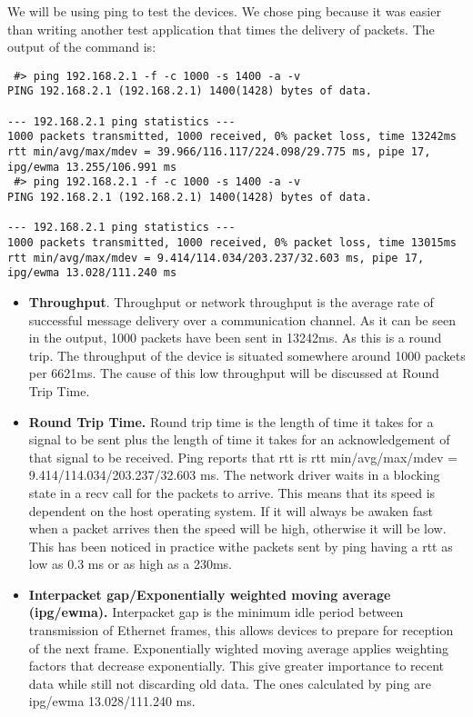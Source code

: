 We will be using ping to test the devices. We chose ping because it was easier than writing another test application
that times the delivery of packets. The output of the command is:
\lstset{language=zsh,caption=,label=lst:pingout}
\begin{lstlisting}
 #> ping 192.168.2.1 -f -c 1000 -s 1400 -a -v
PING 192.168.2.1 (192.168.2.1) 1400(1428) bytes of data.
                 
--- 192.168.2.1 ping statistics ---
1000 packets transmitted, 1000 received, 0% packet loss, time 13242ms
rtt min/avg/max/mdev = 39.966/116.117/224.098/29.775 ms, pipe 17, ipg/ewma 13.255/106.991 ms
 #> ping 192.168.2.1 -f -c 1000 -s 1400 -a -v
PING 192.168.2.1 (192.168.2.1) 1400(1428) bytes of data.
                 
--- 192.168.2.1 ping statistics ---
1000 packets transmitted, 1000 received, 0% packet loss, time 13015ms
rtt min/avg/max/mdev = 9.414/114.034/203.237/32.603 ms, pipe 17, ipg/ewma 13.028/111.240 ms
\end{lstlisting}

\begin{itemize}
  \item \textbf{Throughput}. Throughput or network throughput is the average rate of successful message delivery 
over a communication channel. As it can be seen in the output, 1000 packets have been sent in 13242ms. As this
is a round trip. The throughput of the device is situated somewhere around 1000 packets per 6621ms. The cause of this
low throughput will be discussed at Round Trip Time.
  \item \textbf{Round Trip Time.}  Round trip time is the length of time it takes for a signal to be sent plus the 
length of time it takes for an acknowledgement of that signal to be received. Ping reports that rtt is
rtt min/avg/max/mdev = 9.414/114.034/203.237/32.603 ms. The network driver waits in a blocking state in a recv
call for the packets to arrive. This means that its speed is dependent on the host operating system. If it will
always be awaken fast when a packet arrives then the speed will be high, otherwise it will be low. This has been
noticed in practice withe packets sent by ping having a rtt as low as 0.3 ms or as high as a 230ms.
  \item \textbf{Interpacket gap/Exponentially weighted moving average (ipg/ewma).} Interpacket gap is the minimum idle period
between transmission of Ethernet frames, this allows devices to prepare for reception of the next frame. Exponentially wighted moving
average applies weighting factors that decrease exponentially. This give greater importance to recent data while still not discarding
old data. The ones calculated by ping are ipg/ewma 13.028/111.240 ms.
\end{itemize}

